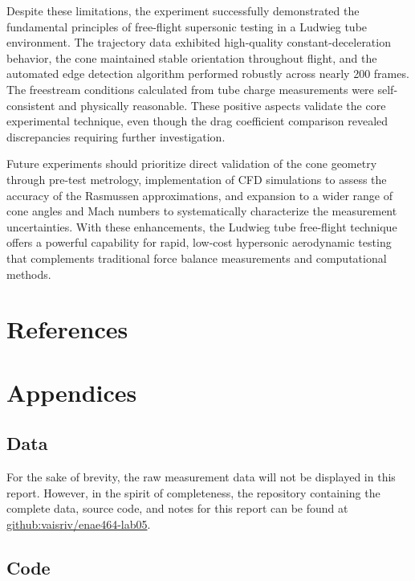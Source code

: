 Despite these limitations, the experiment successfully demonstrated the fundamental principles of free-flight supersonic testing in a Ludwieg tube environment. The trajectory data exhibited high-quality constant-deceleration behavior, the cone maintained stable orientation throughout flight, and the automated edge detection algorithm performed robustly across nearly 200 frames. The freestream conditions calculated from tube charge measurements were self-consistent and physically reasonable. These positive aspects validate the core experimental technique, even though the drag coefficient comparison revealed discrepancies requiring further investigation.

Future experiments should prioritize direct validation of the cone geometry through pre-test metrology, implementation of CFD simulations to assess the accuracy of the Rasmussen approximations, and expansion to a wider range of cone angles and Mach numbers to systematically characterize the measurement uncertainties. With these enhancements, the Ludwieg tube free-flight technique offers a powerful capability for rapid, low-cost hypersonic aerodynamic testing that complements traditional force balance measurements and computational methods.

\section{References} \label{sec:references}

\printbibliography[heading=none]

\section{Appendices} \label{sec:appendices}

\subsection{Data} \label{sec:appendices/data}

For the sake of brevity, the raw measurement data will not be displayed in this report. However, in the spirit of completeness, the repository containing the complete data, source code, and notes for this report can be found at \href{https://www.github.com/vaisriv/enae464-lab05}{github:vaisriv/enae464-lab05}.

\subsection{Code} \label{sec:appendices/code}

